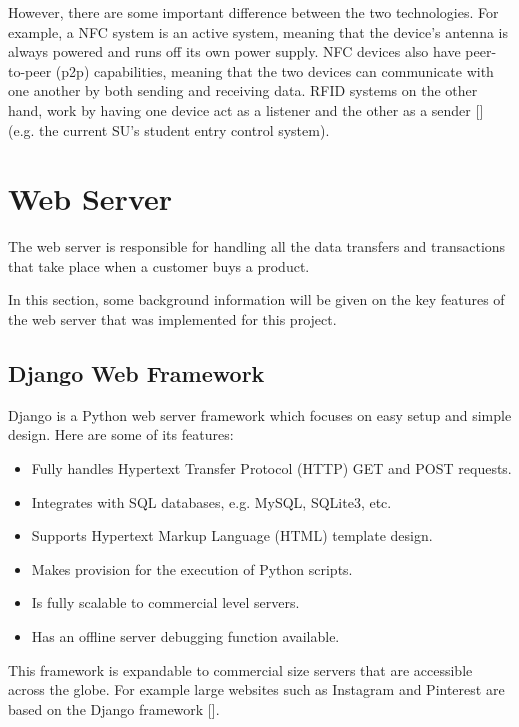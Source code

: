 However, there are some important difference between the two technologies. For example, a NFC
system is  an active system, meaning that the device's antenna is always powered and runs off
its own  power supply. NFC devices also have peer-to-peer (p2p) capabilities, meaning that the
two  devices can communicate with one another by both sending and receiving data.
RFID systems on the  other hand, work by having one device act as a listener and the other as a
sender [\cite{article:diff-nfc-rfid}] (e.g. the current SU's student entry control system).

\section{Web Server}

The web server is responsible for handling all the data transfers and transactions that
take place when a customer buys a product. 

In this section, some background information will be given on
the key features of the web server that was implemented for this project.

\subsection{Django Web Framework}
\label{sec:django}

Django is a Python web server framework which focuses on easy setup and simple design. Here are
some of its features:

\begin{itemize}
  \item Fully handles Hypertext Transfer Protocol (HTTP) GET and POST requests.
  \item Integrates with SQL databases, e.g. MySQL, SQLite3, etc.
  \item Supports Hypertext Markup Language (HTML) template design.
  \item Makes provision for the execution of Python scripts.
  \item Is fully scalable to commercial level servers.
  \item Has an offline server debugging function available.
\end{itemize}

This framework is expandable to commercial size servers that are accessible across the
globe. For example large websites such as Instagram and Pinterest are based on the Django
framework [\cite{website:django-sites}].


